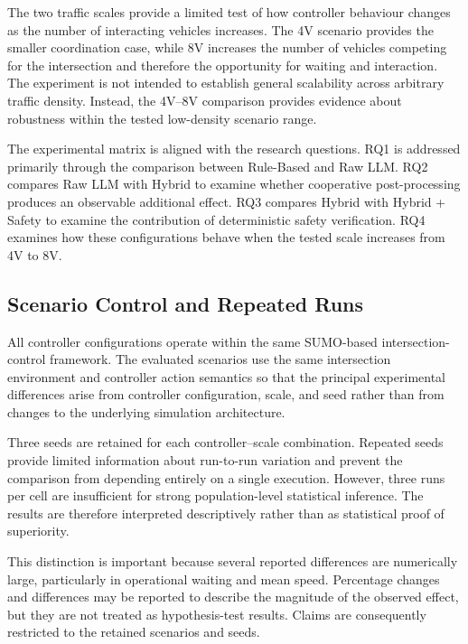 \documentclass[letterpaper,10pt,conference]{ieeeconf}
\begin{document}
The two traffic scales provide a limited test of how controller behaviour changes as the number of interacting vehicles increases. The 4V scenario provides the smaller coordination case, while 8V increases the number of vehicles competing for the intersection and therefore the opportunity for waiting and interaction. The experiment is not intended to establish general scalability across arbitrary traffic density. Instead, the 4V--8V comparison provides evidence about robustness within the tested low-density scenario range.



The experimental matrix is aligned with the research questions. RQ1 is addressed primarily through the comparison between Rule-Based and Raw LLM. RQ2 compares Raw LLM with Hybrid to examine whether cooperative post-processing produces an observable additional effect. RQ3 compares Hybrid with Hybrid + Safety to examine the contribution of deterministic safety verification. RQ4 examines how these configurations behave when the tested scale increases from 4V to 8V.



\subsection{Scenario Control and Repeated Runs}



All controller configurations operate within the same SUMO-based intersection-control framework. The evaluated scenarios use the same intersection environment and controller action semantics so that the principal experimental differences arise from controller configuration, scale, and seed rather than from changes to the underlying simulation architecture.



Three seeds are retained for each controller--scale combination. Repeated seeds provide limited information about run-to-run variation and prevent the comparison from depending entirely on a single execution. However, three runs per cell are insufficient for strong population-level statistical inference. The results are therefore interpreted descriptively rather than as statistical proof of superiority.



This distinction is important because several reported differences are numerically large, particularly in operational waiting and mean speed. Percentage changes and differences may be reported to describe the magnitude of the observed effect, but they are not treated as hypothesis-test results. Claims are consequently restricted to the retained scenarios and seeds.
\end{document}
